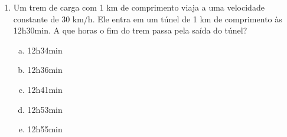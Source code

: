\documentclass[a4paper,14pt]{article}
\begin{document}
\begin{multicols}{2}
\begin{enumerate}
            \item Um trem de carga com 1 km de comprimento viaja a uma velocidade constante de 30 km/h. Ele entra em um túnel de 1 km de comprimento às 12h30min. A que horas o fim do trem passa pela saída do túnel?
            \begin{enumerate}[a)]
            	\item 12h34min
            	\item 12h36min
            	\item 12h41min
            	\item 12h53min
            	\item 12h55min
            \end{enumerate}
    	\end{enumerate}
    $~$ \\ $~$ \\ $~$ \\ $~$ \\ $~$ \\ $~$ \\ $~$ \\ $~$ \\ $~$ \\ $~$ \\ $~$ \\ $~$ \\ $~$ \\ $~$ \\ $~$ \\ $~$ \\ $~$ \\ $~$ \\ $~$ \\ $~$ \\ $~$ \\ $~$ \\ $~$ \\ $~$ \\ $~$ \\ $~$ \\
    \end{multicols}
\end{document}

